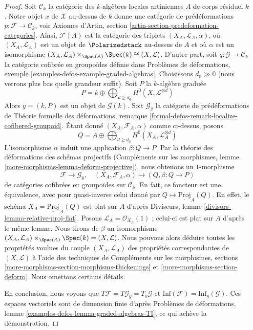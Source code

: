 \begin{proof}
\medskip\noindent
Soit $\mathcal{C}_k$ la catégorie des $k$-algèbres locales artiniennes $A$ de
corps résiduel $k$. Notre objet $x$ de $\mathcal{X}$ au-dessus de $k$ donne une
catégorie de prédéformations
$p : \mathcal{F} \to \mathcal{C}_k$, voir
Axiomes d'Artin, section \ref{artin-section-predeformation-categories}.
Ainsi, $\mathcal{F}(A)$ est la catégorie des triplets
$(X_A, \mathcal{L}_A, \alpha)$, où $(X_A, \mathcal{L}_A)$ est un objet de
$\Polarizedstack$ au-dessus de $A$ et où $\alpha$ est un isomorphisme
$(X_A, \mathcal{L}_A) \times_{\Spec(A)} \Spec(k) \cong (X, \mathcal{L})$.
D'autre part, soit $q : \mathcal{G} \to \mathcal{C}_k$ la catégorie cofibrée
en groupoïdes définie dans
Problèmes de déformations, exemple
\ref{examples-defos-example-graded-algebras}.
Choisissons $d_0 \gg 0$ (nous verrons plus bas quelle grandeur suffit).
Soit $P$ la $k$-algèbre graduée
$$
P = k \oplus \bigoplus\nolimits_{d \geq d_0} H^0(X, \mathcal{L}^{\otimes d})
$$
Alors $y = (k, P)$ est un objet de $\mathcal{G}(k)$.
Soit $\mathcal{G}_y$ la catégorie de prédéformations de
Théorie formelle des déformations, remarque
\ref{formal-defos-remark-localize-cofibered-groupoid}.
Étant donné $(X_A, \mathcal{F}_A, \alpha)$ comme ci-dessus, posons
$$
Q = A \oplus \bigoplus\nolimits_{d \geq d_0} H^0(X_A, \mathcal{L}_A^{\otimes d})
$$
L'isomorphisme $\alpha$ induit une application $\beta : Q \to P$.
Par la théorie des déformations des schémas projectifs
(Compléments sur les morphismes, lemme
\ref{more-morphisms-lemma-deform-projective}), nous obtenons un
$1$-morphisme
$$
\mathcal{F} \longrightarrow \mathcal{G}_y,\quad
(X_A, \mathcal{F}_A, \alpha) \longmapsto (Q, \beta : Q \to P)
$$
de catégories cofibrées en groupoïdes sur $\mathcal{C}_k$.
En fait, ce foncteur est une équivalence, avec pour quasi-inverse celui donné
par $Q \mapsto \underline{\text{Proj}}_A(Q)$.
En effet, le schéma $X_A = \underline{\text{Proj}}_A(Q)$ est plat sur $A$
d'après Diviseurs, lemme \ref{divisors-lemma-relative-proj-flat}.
Posons $\mathcal{L}_A = \mathcal{O}_{X_A}(1)$ ; celui-ci est plat sur $A$
d'après le même lemme. Nous tirons de $\beta$ un isomorphisme
$(X_A, \mathcal{L}_A) \times_{\Spec(A)} \Spec(k) = (X, \mathcal{L})$.
Nous pouvons alors déduire toutes les propriétés voulues du couple
$(X_A, \mathcal{L}_A)$ des propriétés correspondantes de
$(X, \mathcal{L})$ à l'aide des techniques de
Compléments sur les morphismes, sections
\ref{more-morphisms-section-morphisms-thickenings} et
\ref{more-morphisms-section-deform}.
Nous omettons certains détails.

\medskip\noindent
En conclusion, nous voyons que
$T\mathcal{F} = T\mathcal{G}_y = T_y\mathcal{G}$ et
$\text{Inf}(\mathcal{F}) = \text{Inf}_y(\mathcal{G})$.
Ces espaces vectoriels sont de dimension finie d'après
Problèmes de déformations, lemme
\ref{examples-defos-lemma-graded-algebras-TI}, ce qui achève la démonstration.
\end{proof}

